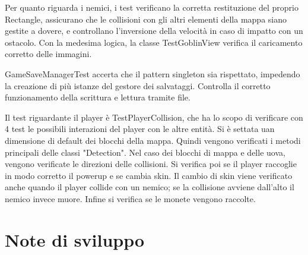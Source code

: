 \documentclass[a4paper,12pt]{report}
\begin{document}
Per quanto riguarda i nemici, i test verificano la corretta restituzione del proprio Rectangle, assicurano che le collisioni con gli
altri elementi della mappa siano gestite a dovere, e controllano l'inversione della velocità in caso di impatto con un ostacolo.
Con la medesima logica, la classe TestGoblinView verifica il caricamento corretto delle immagini.

GameSaveManagerTest accerta che il pattern singleton sia rispettato, impedendo la creazione di più istanze del gestore dei 
salvataggi. Controlla il corretto funzionamento della scrittura e lettura tramite file.

Il test riguardante il player è TestPlayerCollision, che ha lo scopo di verificare con 4 test le possibili interazioni del player con
le altre entità. Si è settata uan dimensione di default dei blocchi della mappa.
Quindi vengono verificati i metodi principali delle classi "Detection". Nel caso dei blocchi di mappa e delle uova,
vengono verificate le direzioni delle collisioni. Si verifica poi se il player raccoglie in modo corretto il powerup e se cambia skin.
Il cambio di skin viene verificato anche quando il player collide con un nemico; se la collisione avviene dall'alto il nemico 
invece muore. Infine si verifica se le monete vengono raccolte.

\section{Note di sviluppo}
\end{document}
